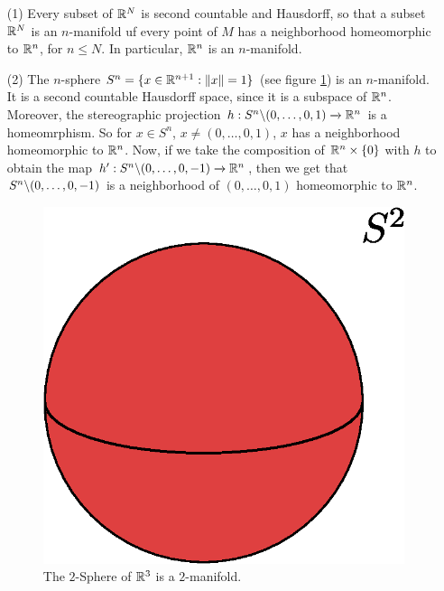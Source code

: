 \begin{example}\label{example_1.1}
    \begin{enumerate}
        \item[(1)] Every subset of $\mathbb{R}^N$ is second countable and Hausdorff, so
            that a subset  $\mathbb{R}^N$ is an  $n$-manifold uf every point of  $M$ has
            a neighborhood homeomorphic to  $\mathbb{R}^n$, for $n \leq N$. In
            particular, $\mathbb{R}^n$ is an $n$-manifold.

            \item[(2)] The $n$-sphere  $S^n=\{x \in \mathbb{R}^{n+1} : \|x\|=1\}$ (see
                figure \ref{fig_1.1}) is an $n$-manifold. It is a second countable
                Hausdorff space, since it is a subspace of  $\mathbb{R}^n$. Moreover, the
                stereographic projection $h:S^n \backslash (0, \dots, 0,1)
                \xrightarrow{} \mathbb{R}^n$ is a homeomrphism. So for $x \in S^n$,
                $x \neq (0, \dots, 0,1)$, $x$ has a neighborhood homeomorphic to
                $\mathbb{R}^n$. Now, if we take the composition of  $\mathbb{R}^n \times \{0\}$
                with $h$ to obtain the map  $h':S^n \backslash (0,\dots,0,-1)
                \xrightarrow{} \mathbb{R}^n$, then we get that $S^n \backslash (0, \dots, 0,-1)$
                is a neighborhood of $(0, \dots, 0,1)$ homeomorphic to $\mathbb{R}^n$.
                  \begin{figure}[h]
                     \centering
                     \includegraphics[scale=0.5]{Figures/Chapter1/2_sphere.eps}
                     \caption{The $2$-Sphere of $\mathbb{R}^3$ is a $2$-manifold.}
                     \label{fig_1.1}
                 \end{figure}


\end{enumerate}
\end{example}
